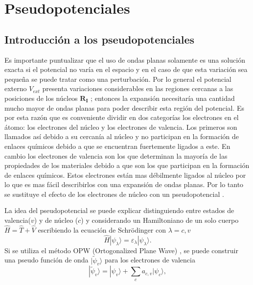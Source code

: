    \section{Pseudopotenciales}\label{sec:pseudo}
   \subsection{Introducci\'on a los pseudopotenciales} \label{subsec:introPseudo}
   Es importante puntualizar que el uso de ondas planas solamente es una soluci\'on exacta si el potencial no var\'ia en el espacio y en el caso de que esta variaci\'on sea peque\~na  se puede tratar como una perturbaci\'on. Por lo general  el potencial externo $V_{ext}$ presenta variaciones considerables en las regiones cercanas a  las posiciones de los n\'ucleos $\pmb{R_I}$ \cite{Faustino-2014}; entonces la expansi\'on necesitar\'ia una cantidad mucho mayor de ondas planas para poder describir esta regi\'on del potencial. Es por esta raz\'on que es conveniente dividir en dos categor\'ias los electrones en el \'atomo: los electrones del n\'ucleo y los electrones de valencia. Los primeros son llamados así  debido a su cercan\'ia al n\'ucleo y no participan en la formaci\'on de enlaces qu\'imicos debido a que se encuentran fuertemente ligados a este. En cambio los electrones de valencia son los que determinan la mayor\'ia de las propiedades de los materiales debido a que son los que participan en la formaci\'on de  enlaces qu\'imicos. Estos electrones est\'an mas d\'ebilmente ligados al n\'ucleo por lo que es mas f\'acil describirlos con una expansi\'on de ondas planas.  Por lo tanto  se sustituye el efecto de los electrones de n\'ucleo con un pseudopotencial \cite{MB-2015}.
   \newline
   \par La idea del pseudopotencial se puede explicar distinguiendo entre estados de valencia($v$) y de n\'ucleo ($c$) y considerando un Hamiltoniano de un solo cuerpo $\hat{H} = \hat{T} + \hat{V}$  escribiendo la ecuaci\'on de Schr\"odinger con $\lambda= c,v$ \cite{PhysRev.116.287}
   \begin{equation*}
   \hat{H} | \psi_{\lambda} \rangle = \varepsilon_{\lambda} | \psi_{\lambda} \rangle. 
   \end{equation*}    
   Si se utiliza el m\'etodo OPW (Ortogonalized Plane Wave) \cite{PhysRev.57.1169}, se puede construir una pseudo funci\'on de onda $|\tilde{\psi}_v \rangle $ para los electrones de valencia
   \begin{equation}
   |\tilde{\psi}_v \rangle = | \psi_v \rangle + \sum_c a_{c,v} |\psi_c \rangle,
   \end{equation}
